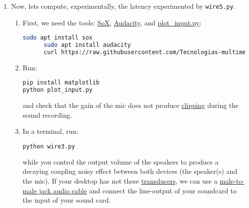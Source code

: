 \begin{enumerate}
  Stop (killing) the module by clicking the CTRL- and c-keys (CTRL+c),
  simultaneously.



\item Now, lets compute, experimentally, the latency experimented by
  \texttt{wire5.py}.

  \begin{enumerate}
  \item First, we need the
    tools: \href{http://sox.sourceforge.net/}{SoX}, \href{https://www.audacityteam.org/}{Audacity},
    and \href{https://raw.githubusercontent.com/Tecnologias-multimedia/intercom/master/test/sounddevice/plot_input.py}{plot\_input.py}:
    
    \begin{lstlisting}[language=Bash]
      sudo apt install sox
      sudo apt install audacity
      curl https://raw.githubusercontent.com/Tecnologias-multimedia/intercom/master/test/sounddevice/plot_input.py > plot_input.py
    \end{lstlisting}
    
  \item Run:
    
    \begin{lstlisting}[language=Bash]
pip install matplotlib
python plot_input.py
    \end{lstlisting}

    and check that the gain of the mic does not
    produce \href{https://en.wikipedia.org/wiki/Clipping_(audio)}{clipping}
    during the sound recording.

  \item \label{start_point} In a terminal, run:

    \begin{lstlisting}[language=Bash]
python wire3.py
    \end{lstlisting}

    while you control the output volume of the speakers to produce a
    decaying coupling noisy effect between both devices (the
    speaker(s) and the mic). If your desktop has not these
    \href{https://en.wikipedia.org/wiki/Transducer}{transducers}, we
    can use a
    \href{https://www.google.com/search?q=male+to+male+audio+jack+cable&client=firefox-b-d&sxsrf=ALeKk00GZUDGqiOfc0D8xkA_MIYgCuZmSA:1600270049146&source=lnms&tbm=isch&sa=X&ved=2ahUKEwjdvsu-_u3rAhXl0eAKHS90DUoQ_AUoAXoECA0QAw&biw=4288&bih=972}{male-to-male
      jack audio cable} and connect the line-output of your soundcard
    to the input of your sound card.


\end{enumerate}
\end{enumerate}
